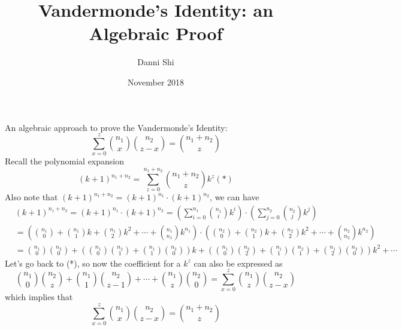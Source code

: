 \documentclass[11pt,letterpaper]{article}
\title{Vandermonde's Identity: an Algebraic Proof}
\author{Danni Shi}
\date{November 2018}
\begin{document}
\maketitle
\noindent An algebraic approach to prove the Vandermonde's Identity:
$$\sum_{x=0}^z \binom{n_1}{x} \binom{n_2}{z-x} = \binom{n_1 + n_2}{z}$$
\noindent Recall the polynomial expansion
$$(k+1)^{n_1 + n_2} = \sum_{z=0}^{n_1 + n_2} \binom{n_1 + n_2}{z}k^z (*)$$
\noindent Also note that $(k+1)^{n_1 + n_2} = (k+1)^{n_1} \cdot (k+1)^{n_2}$, we can have
\begin{align*}
&(k+1)^{n_1 + n_2} = (k+1)^{n_1} \cdot (k+1)^{n_2} = \left(\sum_{i=0}^{n_1} \binom{n_1}{i} k^i\right) \cdot \left(\sum_{j=0}^{n_2} \binom{n_2}{j} k^j\right) \\
&= \left(\binom{n_1}{0} + \binom{n_1}{1}k + \binom{n_1}{2}k^2 + \cdots + \binom{n_1}{n_1}k^{n_1}\right) \cdot \left(\binom{n_2}{0} + \binom{n_2}{1}k + \binom{n_2}{2}k^2 + \cdots + \binom{n_2}{n_2}k^{n_2}\right)\\
&= \binom{n_1}{0} \binom{n_2}{0} + \left(\binom{n_1}{0}\binom{n_2}{1} + \binom{n_1}{1}\binom{n_2}{0}\right)k + \left(\binom{n_1}{0}\binom{n_2}{2} + \binom{n_1}{1}\binom{n_2}{1} + \binom{n_1}{2}\binom{n_2}{0}\right)k^2 + \cdots
\end{align*}
\noindent Let's go back to (*), so now the coefficient for a $k^z$ can also be expressed as
$$\binom{n_1}{0}\binom{n_2}{z} + \binom{n_1}{1}\binom{n_2}{z-1} + \cdots + \binom{n_1}{z}\binom{n_2}{0} = \sum_{x=0}^z \binom{n_1}{z}\binom{n_2}{z-x}$$
\noindent which implies that 
$$\sum_{x=0}^z \binom{n_1}{x} \binom{n_2}{z-x} = \binom{n_1 + n_2}{z}$$
\end{document}
